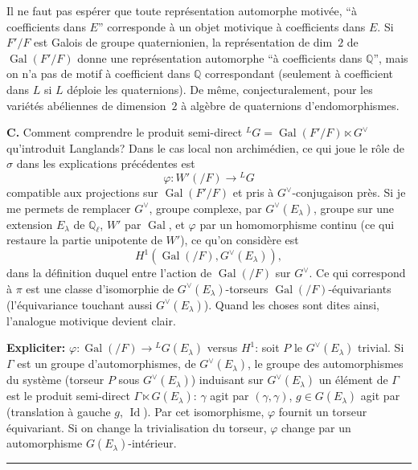 \documentclass[11pt,a4paper]{article}
\theoremstyle{plain}
\theoremstyle{definition}
\DeclareMathOperator{\Gal}{Gal}
\DeclareMathOperator{\Id}{Id}
\begin{document}
Il ne faut pas esp\'{e}rer que toute repr\'{e}sentation automorphe motiv\'{e}e, ``\`{a} coefficients dans $E$'' corresponde \`{a} un objet motivique \`{a} coefficients dans $E$. Si $F'/F$ est Galois de groupe quaternionien, la repr\'{e}sentation de dim~$2$ de $\Gal(F'/F)$ donne une repr\'{e}sentation automorphe ``\`{a} coefficients dans $\mathbb Q$'', mais on n'a pas de motif \`{a} coefficient dans $\mathbb Q$ correspondant (seulement \`{a} coefficient dans $L$ si $L$ d\'{e}ploie les quaternions). De m\^{e}me, conjecturalement, pour les vari\'{e}t\'{e}s ab\'{e}liennes de dimension~$2$ \`{a} alg\`{e}bre de quaternions d'endomorphismes.

\bigskip
\noindent \textbf{C.} Comment comprendre le produit semi-direct ${}^LG = \Gal(F'/F) \ltimes G^\vee$ qu'introduit Langlands? Dans le cas local non archim\'{e}dien, ce qui joue le r\^{o}le de $\sigma$ dans les explications pr\'{e}c\'{e}dentes est
\[
\varphi \colon W'(/F) \longrightarrow {}^LG
\]
compatible aux projections sur $\Gal(F'/F)$ et pris \`{a} $G^\vee$-conjugaison pr\`{e}s. Si je me permets de remplacer $G^\vee$, groupe complexe, par $G^\vee(E_\lambda)$, groupe sur une extension $E_\lambda$ de $\mathbb Q_\ell$, $W'$ par $\Gal$, et $\varphi$ par un homomorphisme continu (ce qui restaure la partie unipotente de $W'$), ce qu'on consid\`{e}re est
\[
H^1(\Gal(/F), G^\vee(E_\lambda)),
\]
dans la d\'{e}finition duquel entre l'action de $\Gal(/F)$ sur $G^\vee$. Ce qui correspond \`{a} $\pi$ est une classe d'isomorphie de $G^\vee(E_\lambda)$-torseurs $\Gal(/F)$-\'{e}quivariants (l'\'{e}quivariance touchant aussi $G^\vee(E_\lambda)$). Quand les choses sont dites ainsi, l'analogue motivique devient clair.

\smallskip
\textbf{Expliciter:} $\varphi \colon \Gal(/F) \to {}^LG(E_\lambda)$ versus $H^1$: soit $P$ le $G^\vee(E_\lambda)$ trivial. Si $\Gamma$ est un groupe d'automorphismes, de $G^\vee(E_\lambda)$, le groupe des automorphismes du syst\`{e}me (torseur $P$ sous $G^\vee(E_\lambda)$) induisant sur $G^\vee(E_\lambda)$ un \'{e}l\'{e}ment de $\Gamma$ est le produit semi-direct $\Gamma \ltimes G(E_\lambda)$: $\gamma$ agit par $(\gamma,\gamma)$, $g \in G(E_\lambda)$ agit par (translation \`{a} gauche $g$, $\Id$). Par cet isomorphisme, $\varphi$ fournit un torseur \'{e}quivariant. Si on change la trivialisation du torseur, $\varphi$ change par un automorphisme $G(E_\lambda)$-int\'{e}rieur.

\begin{center}
\rule{4cm}{0.4pt}
\end{center}
\end{document}
